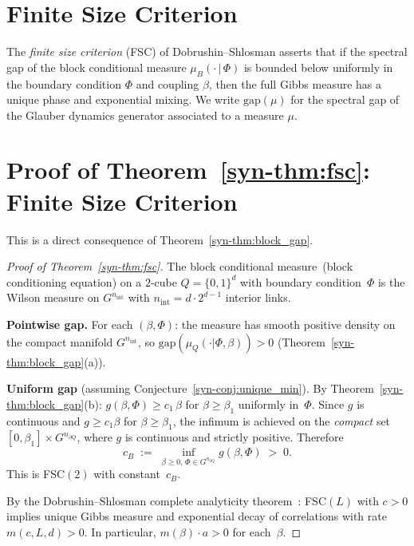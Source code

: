 \documentclass[11pt]{article}
\theoremstyle{definition}
\newcommand{\gap}{\mathrm{gap}}
\begin{document}

\section{Finite Size Criterion}\label{sec:fsc}

The \emph{finite size criterion} (FSC) of Dobrushin--Shlosman
asserts that if the spectral gap of the block conditional measure
$\mu_B(\cdot\,|\,\Phi)$ is bounded below uniformly in the
boundary condition $\Phi$ and coupling $\beta$,
then the full Gibbs measure has a unique phase and exponential
mixing.  We write $\gap(\mu)$ for the spectral gap
of the Glauber dynamics generator associated to a measure $\mu$.

\section{Proof of Theorem~\ref{syn-thm:fsc}:
Finite Size Criterion}\label{syn-sec:fsc}

This is a direct consequence of Theorem~\ref{syn-thm:block_gap}.

\begin{proof}[Proof of Theorem~\ref{syn-thm:fsc}]
The block conditional measure~(block conditioning equation) on a
$2$-cube $Q = \{0, 1\}^d$ with boundary condition~$\Phi$
is the Wilson measure on $G^{n_{\mathrm{int}}}$ with
$n_{\mathrm{int}} = d \cdot 2^{d-1}$ interior links.

\textbf{Pointwise gap.}
For each $(\beta, \Phi)$: the measure has smooth positive
density on the compact manifold $G^{n_{\mathrm{int}}}$,
so $\gap(\mu_Q(\cdot|\Phi,\beta)) > 0$
(Theorem~\ref{syn-thm:block_gap}(a)).

\textbf{Uniform gap}
(assuming Conjecture~\ref{syn-conj:unique_min}).
By Theorem~\ref{syn-thm:block_gap}(b):
$g(\beta, \Phi) \geq c_1\,\beta$ for $\beta \geq \beta_1$
uniformly in~$\Phi$.  Since $g$ is continuous and
$g \geq c_1\beta$ for $\beta \geq \beta_1$,
the infimum is achieved on the \emph{compact} set
$[0, \beta_1] \times G^{n_{\partial Q}}$, where $g$
is continuous and strictly positive.  Therefore
\begin{equation}
  c_B \;:=\;
  \inf_{\beta \geq 0,\, \Phi \in G^{n_{\partial Q}}}
  g(\beta, \Phi) \;>\; 0.
\end{equation}
This is FSC$(2)$ with constant~$c_B$.

By the Dobrushin--Shlosman complete analyticity
theorem~\cite{DobrushinShlosman,Martinelli1999}:
FSC$(L)$ with $c > 0$ implies unique Gibbs measure
and exponential decay of correlations with rate
$m(c, L, d) > 0$. In particular,
$m(\beta) \cdot a > 0$ for each~$\beta$.
\end{proof}
\end{document}
